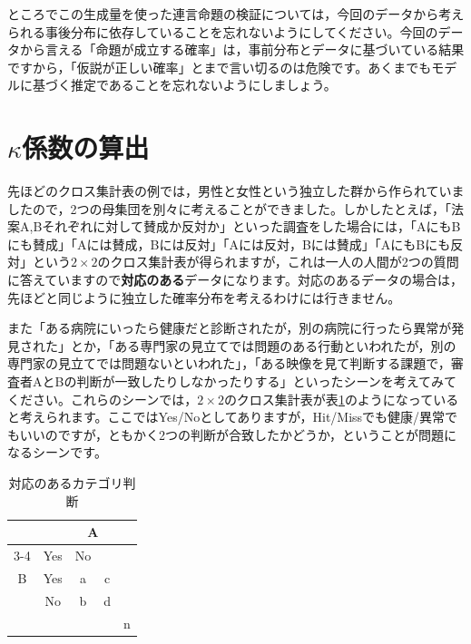 \documentclass{ltjsbook}
\begin{document}
ところでこの生成量を使った連言命題の検証については，今回のデータから考えられる事後分布に依存していることを忘れないようにしてください。今回のデータから言える「命題が成立する確率」は，事前分布とデータに基づいている結果ですから，「仮説が正しい確率」とまで言い切るのは危険です。あくまでもモデルに基づく推定であることを忘れないようにしましょう。
\section{$\kappa$係数の算出}
先ほどのクロス集計表の例では，男性と女性という独立した群から作られていましたので，2つの母集団を別々に考えることができました。しかしたとえば，「法案A,Bそれぞれに対して賛成か反対か」といった調査をした場合には，「AにもBにも賛成」「Aには賛成，Bには反対」「Aには反対，Bには賛成」「AにもBにも反対」という$2\times 2$のクロス集計表が得られますが，これは一人の人間が2つの質問に答えていますので\textbf{対応のある}データになります。対応のあるデータの場合は，先ほどと同じように独立した確率分布を考えるわけには行きません。

また「ある病院にいったら健康だと診断されたが，別の病院に行ったら異常が発見された」とか，「ある専門家の見立てでは問題のある行動といわれたが，別の専門家の見立てでは問題ないといわれた」，「ある映像を見て判断する課題で，審査者AとBの判断が一致したりしなかったりする」といったシーンを考えてみてください。これらのシーンでは，$2\times2$のクロス集計表が表\ref{tbl:10_03}のようになっていると考えられます。ここではYes/Noとしてありますが，Hit/Missでも健康/異常でもいいのですが，ともかく2つの判断が合致したかどうか，ということが問題になるシーンです。

\begin{table}[ht]
	\centering
	\caption{対応のあるカテゴリ判断}
	\begin{tabular}{c|c|cc|c}
		\multicolumn{2}{c|}{} & \multicolumn{2}{c|}{A}              \\
		\cline{3-4}
		\multicolumn{2}{c|}{}
		                      & Yes                    & No &       \\ \hline
		B                     & Yes                    & a  & c &   \\
		                      & No                     & b  & d &   \\ \hline
		                      &                        &    &   & n \\
	\end{tabular}
	\label{tbl:10_03}
\end{table}
\end{document}
